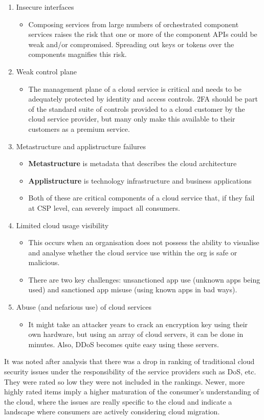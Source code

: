 \documentclass[11pt,a4paper,titlepage,dvipsnames,cmyk]{scrartcl}
\begin{document}
\begin{enumerate}
\begin{itemize}
\end{itemize}
\item Insecure interfaces
\begin{itemize}
    \item Composing services from large numbers of orchestrated component services raises the risk that one or more of the component APIs could be weak and/or compromised. Spreading out keys or tokens over the components magnifies this risk.
\end{itemize}
\item {\color{red}Weak control plane}
\begin{itemize}
    \item The management plane of a cloud service is critical and needs to be adequately protected by identity and access controls. 2FA should be part of the standard suite of controls provided to a cloud customer by the cloud service provider, but many only make this available to their customers as a premium service.
\end{itemize}
\item {\color{red}Metastructure and applistructure failures}
\begin{itemize}
    \item \textbf{Metastructure} is metadata that describes the cloud architecture
    \item \textbf{Applistructure} is technology infrastructure and business applications
    \item Both of these are critical components of a cloud service that, if they fail at CSP level, can severely impact all consumers.
\end{itemize}
\item {\color{red}Limited cloud usage visibility}
\begin{itemize}
    \item This occurs when an organisation does not possess the ability to visualise and analyse whether the cloud service use within the org is safe or malicious.
    \item There are two key challenges: unsanctioned app use (unknown apps being used) and sanctioned app misuse (using known apps in bad ways).
\end{itemize}
\item Abuse (and nefarious use) of cloud services
\begin{itemize}
    \item It might take an attacker years to crack an encryption key using their own hardware, but using an array of cloud servers, it can be done in minutes. Also, DDoS becomes quite easy using these servers.
\end{itemize}

\end{enumerate}

It was noted after analysis that there was a drop in ranking of traditional cloud security issues under the responsibility of the service providers such as DoS, etc. They were rated so low they were not included in the rankings. Newer, more highly rated items imply a higher maturation of the consumer's understanding of the cloud, where the issues are really specific to the cloud and indicate a landscape where consumers are actively considering cloud migration.
\end{document}
